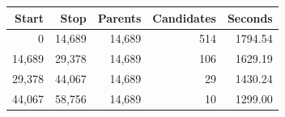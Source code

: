 \begin{tabular}{rrrrr}
\toprule
Start & Stop & Parents & Candidates & Seconds \\
\midrule
0 & 14,689 & 14,689 & 514 & 1794.54 \\
14,689 & 29,378 & 14,689 & 106 & 1629.19 \\
29,378 & 44,067 & 14,689 & 29 & 1430.24 \\
44,067 & 58,756 & 14,689 & 10 & 1299.00 \\
\bottomrule
\end{tabular}
